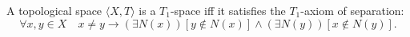 A topological space $\langle X, T \rangle$ is a $T_1$-space iff it satisfies the $T_1$-axiom of separation:
$$\forall x, y \in X \quad
x \neq y \rightarrow (\exists N(x))[y \notin N(x)] \wedge (\exists N(y))[x \notin N(y)].$$
